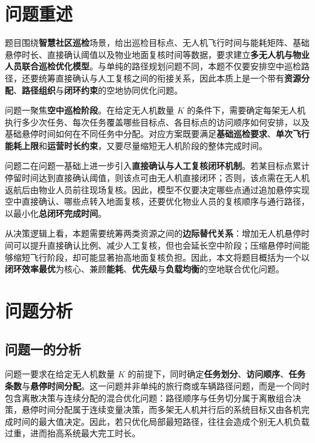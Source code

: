 \documentclass[12pt]{article}
\begin{document}
\clearpage
\tableofcontents
\clearpage

\section{问题重述}
题目围绕\textbf{智慧社区巡检}场景，给出巡检目标点、无人机飞行时间与能耗矩阵、基础悬停时长、直接确认阈值以及物业地面复核时间等数据，要求建立\textbf{多无人机与物业人员联合巡检优化模型}。与单纯的路径规划问题不同，本题不仅要安排空中巡检路径，还要统筹直接确认与人工复核之间的衔接关系，因此本质上是一个带有\textbf{资源分配}、\textbf{路径组织}与\textbf{闭环约束}的空地协同优化问题。

问题一聚焦\textbf{空中巡检阶段}。在给定无人机数量 $K$ 的条件下，需要确定每架无人机执行多少次任务、每次任务覆盖哪些目标点、各目标点的访问顺序如何安排，以及基础悬停时间如何在不同任务中分配。对应方案既要满足\textbf{基础巡检要求}、\textbf{单次飞行能耗上限}和\textbf{运营时长约束}，又要尽量缩短无人机阶段的整体完成时间。

问题二在问题一基础上进一步引入\textbf{直接确认与人工复核闭环机制}。若某目标点累计停留时间达到直接确认阈值，则该点可由无人机直接闭环；否则，该点需在无人机返航后由物业人员前往现场复核。因此，模型不仅要决定哪些点通过追加悬停实现空中直接确认、哪些点转入地面复核，还要优化物业人员的复核顺序与通行路径，以最小化\textbf{总闭环完成时间}。

从决策逻辑上看，本题需要统筹两类资源之间的\textbf{边际替代关系}：增加无人机悬停时间可以提升直接确认比例、减少人工复核，但也会延长空中阶段；压缩悬停时间能够缩短飞行阶段，却可能显著抬高地面复核负担。因此，本文将题目概括为一个以\textbf{闭环效率最优}为核心、兼顾\textbf{能耗}、\textbf{优先级}与\textbf{负载均衡}的空地联合优化问题。

\section{问题分析}

\subsection{问题一的分析}
问题一要求在给定无人机数量 $K$ 的前提下，同时确定\textbf{任务划分}、\textbf{访问顺序}、\textbf{任务条数}与\textbf{悬停时间分配}。这一问题并非单纯的旅行商或车辆路径问题，而是一个同时包含离散决策与连续分配的混合优化问题：路径顺序与任务切分属于离散组合决策，悬停时间分配属于连续变量决策，而多架无人机并行后的系统目标又由各机完成时间的最大值决定。因此，若只优化局部最短路径，往往会造成个别无人机负载过重，进而抬高系统最大完工时长。
\end{document}
